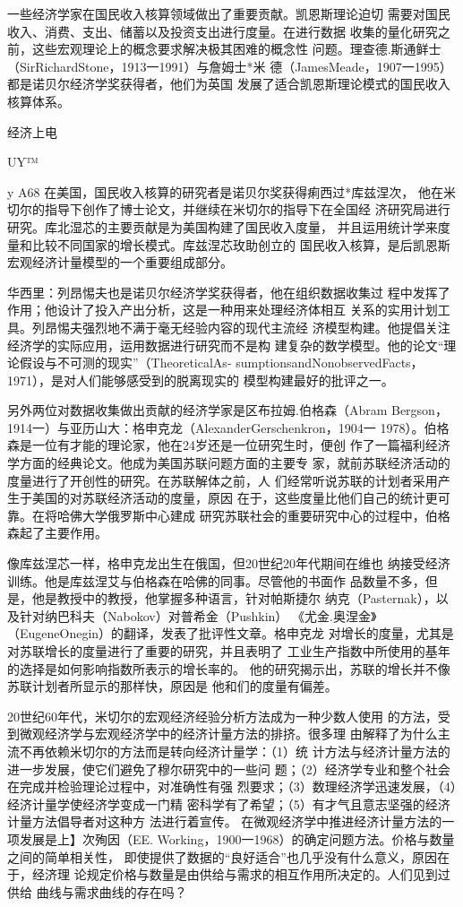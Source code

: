 一些经济学家在国民收入核算领域做出了重要贡献。凯恩斯理论迫切
需要对国民收入、消费、支出、储蓄以及投资支出进行度量。在进行数据
收集的量化研究之前，这些宏观理论上的概念要求解决极其困难的概念性
问题。理查德.斯通鲜士（SirRichardStone，1913一1991）与詹姆士*米
德（JamesMeade，1907一1995）都是诺贝尔经济学奖获得者，他们为英国
发展了适合凯恩斯理论模式的国民收入核算体系。


经济上电

UY™

y
A68
在美国，国民收入核算的研究者是诺贝尔奖获得痢西过*库兹涅次，
他在米切尔的指导下创作了博士论文，并继续在米切尔的指导下在全国经
济研究局进行研究。库北湿芯的主要贡献是为美国构建了国民收入度量，
并且运用统计学来度量和比较不同国家的增长模式。库兹涅芯玫助创立的
国民收入核算，是后凯恩斯宏观经济计量模型的一个重要组成部分。

华西里：列昂惕夫也是诺贝尔经济学奖获得者，他在组织数据收集过
程中发挥了作用；他设计了投入产出分析，这是一种用来处理经济体相互
关系的实用计划工具。列昂惕夫强烈地不满于毫无经验内容的现代主流经
济模型构建。他提倡关注经济学的实际应用，运用数据进行研究而不是构
建复杂的数学模型。他的论文“理论假设与不可测的现实”（TheoreticalAs-
sumptionsandNonobservedFacts，1971），是对人们能够感受到的脱离现实的
模型构建最好的批评之一。

另外两位对数据收集做出贡献的经济学家是区布拉姆.伯格森（Abram
Bergson，1914一）与亚历山大：格申克龙（AlexanderGerschenkron，1904一
1978）。伯格森是一位有才能的理论家，他在24岁还是一位研究生时，便创
作了一篇福利经济学方面的经典论文。他成为美国苏联问题方面的主要专
家，就前苏联经济活动的度量进行了开创性的研究。在苏联解体之前，人
们经常听说苏联的计划者采用产生于美国的对苏联经济活动的度量，原因
在于，这些度量比他们自己的统计更可靠。在将哈佛大学俄罗斯中心建成
研究苏联社会的重要研究中心的过程中，伯格森起了主要作用。

像库兹涅芯一样，格申克龙出生在俄国，但20世纪20年代期间在维也
纳接受经济训练。他是库兹涅艾与伯格森在哈佛的同事。尽管他的书面作
品数量不多，但是，他是教授中的教授，他掌握多种语言，针对帕斯捷尔
纳克（Pasternak），以及针对纳巴科夫（Nabokov）对普希金（Pushkin）
《尤金.奥涅金》（EugeneOnegin）的翻译，发表了批评性文章。格申克龙
对增长的度量，尤其是对苏联增长的度量进行了重要的研究，并且表明了
工业生产指数中所使用的基年的选择是如何影响指数所表示的增长率的。
他的研究揭示出，苏联的增长并不像苏联计划者所显示的那样快，原因是
他和们的度量有偏差。

20世纪60年代，米切尔的宏观经济经验分析方法成为一种少数人使用
的方法，受到微观经济学与宏观经济学中的经济计量方法的排挤。很多理
由解释了为什么主流不再依赖米切尔的方法而是转向经济计量学：（1）统
计方法与经济计量方法的进一步发展，使它们避免了穆尔研究中的一些问
题；（2）经济学专业和整个社会在完成并检验理论过程中，对准确性有强
烈要求；（3）数理经济学迅速发展，（4）经济计量学使经济学变成一门精
密科学有了希望；（5）有才气且意志坚强的经济计量方法倡导者对这种方
法进行着宣传。
在微观经济学中推进经济计量方法的一项发展是上】次殉因（EE.
Working，1900一1968）的确定问题方法。价格与数量之间的简单相关性，
即使提供了数据的“良好适合”也几乎没有什么意义，原因在于，经济理
论规定价格与数量是由供给与需求的相互作用所决定的。人们见到过供给
曲线与需求曲线的存在吗？

